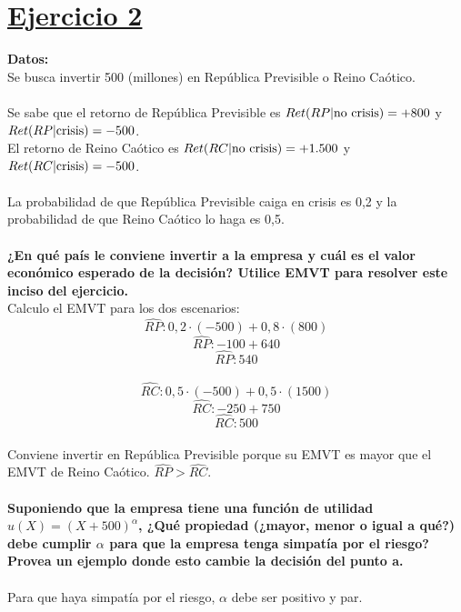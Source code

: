 \documentclass{article}
\begin{document}
    \section*{\underline{Ejercicio 2}}
        \textbf{Datos:}
        \\
        Se busca invertir 500 (millones) en República Previsible o Reino Caótico.
        \\
        \\
        Se sabe que el retorno de República Previsible es \(Ret(RP | $no crisis$) = +800\) y \(Ret(RP | $crisis$) = -500\).
        \\
        El retorno de Reino Caótico es \(Ret(RC | $no crisis$) = +1.500\) y \(Ret(RC | $crisis$) = -500\).
        \\
        \\
        La probabilidad de que República Previsible caiga en crisis es 0,2 y la probabilidad de que Reino Caótico lo haga es 0,5.
        \\
        \\
        \textbf{¿En qué país le conviene invertir a la empresa y cuál es el valor económico esperado de la decisión? Utilice EMVT para resolver este inciso del ejercicio.}
        \\
        Calculo el EMVT para los dos escenarios:
        \[\hat{RP}: 0,2 \cdot (-500) + 0,8 \cdot (800)\]
        \[\hat{RP}: -100 + 640\]
        \[\hat{RP}: 540\]
        \\
        \[\hat{RC}: 0,5 \cdot (-500) + 0,5 \cdot (1500)\]
        \[\hat{RC}: -250 + 750\]
        \[\hat{RC}: 500\]
        \\
        Conviene invertir en República Previsible porque su EMVT es mayor que el EMVT de Reino Caótico. \(\hat{RP} > \hat{RC}\).
        \\
        \\
        \textbf{Suponiendo que la empresa tiene una función de utilidad \(u(X) = (X + 500)^{\alpha}\), ¿Qué propiedad (¿mayor, menor o igual a qué?) debe cumplir \(\alpha\) para que la empresa tenga simpatía por el riesgo? Provea un ejemplo donde esto cambie la decisión del punto a.}
        \\
        \\
        Para que haya simpatía por el riesgo, \(\alpha\) debe ser positivo y par.
\end{document}
